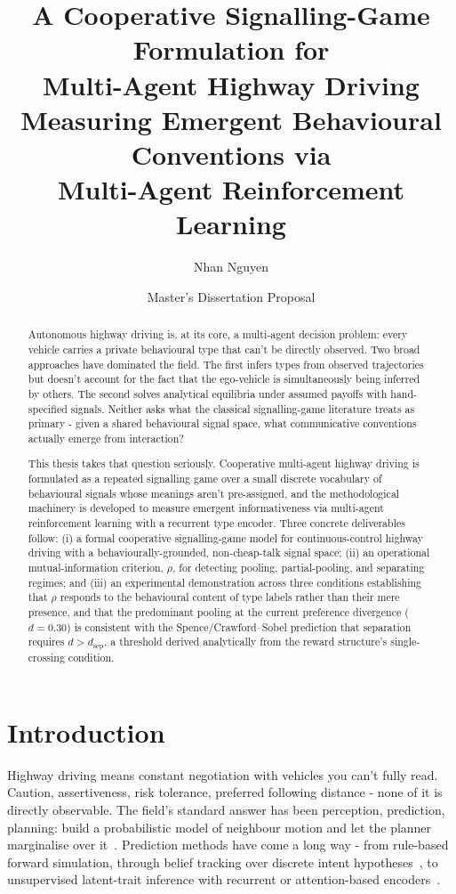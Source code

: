\documentclass[12pt,a4paper]{article}
\title{\textbf{A Cooperative Signalling-Game Formulation for\\[0.3em]
Multi-Agent Highway Driving}\\[0.6em]
\large Measuring Emergent Behavioural Conventions via\\
Multi-Agent Reinforcement Learning}
\author{Nhan Nguyen}
\date{Master's Dissertation Proposal}
\begin{document}
\maketitle

\begin{abstract}
Autonomous highway driving is, at its core, a multi-agent decision problem: every vehicle
carries a private behavioural type that can't be directly observed. Two broad approaches have
dominated the field. The first infers types from observed trajectories but doesn't account for the
fact that the ego-vehicle is simultaneously being inferred by others. The second solves analytical
equilibria under assumed payoffs with hand-specified signals. Neither asks what the classical
signalling-game literature treats as primary - given a shared behavioural signal space, what
communicative conventions actually emerge from interaction?

This thesis takes that question seriously. Cooperative multi-agent highway driving is formulated
as a repeated signalling game over a small discrete vocabulary of behavioural signals whose
meanings aren't pre-assigned, and the methodological machinery is developed to measure
emergent informativeness via multi-agent reinforcement learning with a recurrent type encoder. Three concrete deliverables follow: (i) a formal cooperative signalling-game model for
continuous-control highway driving with a behaviourally-grounded, non-cheap-talk signal space;
(ii) an operational mutual-information criterion, $\rho$, for detecting pooling, partial-pooling, and
separating regimes; and (iii) an experimental demonstration across three conditions establishing
that $\rho$ responds to the behavioural content of type labels rather than their mere presence,
and that the predominant pooling at the current preference divergence ($d=0.30$) is consistent
with the Spence/Crawford--Sobel prediction that separation requires $d > d_{\text{sep}}$, a
threshold derived analytically from the reward structure's single-crossing condition.
\end{abstract}

\section{Introduction}

Highway driving means constant negotiation with vehicles you can't fully read. Caution,
assertiveness, risk tolerance, preferred following distance - none of it is directly observable.
The field's standard answer has been perception, prediction, planning: build a probabilistic model
of neighbour motion and let the planner marginalise over it~\cite{chen2022milestones,yurtsever2020survey}.
Prediction methods have come a long way - from rule-based forward simulation, through belief
tracking over discrete intent hypotheses~\cite{bai2015intention,zhou2018joint}, to unsupervised
latent-trait inference with recurrent or attention-based
encoders~\cite{liu2022learning,liu2024automatic,ma2021reinforcement}.
\end{document}

